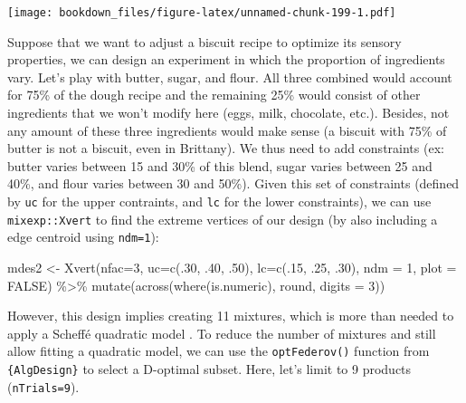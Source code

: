 \documentclass[
]{krantz}
\makeatletter
\newenvironment{Shaded}{\begin{snugshade}}{\end{snugshade}}
\newcommand{\AttributeTok}[1]{\textcolor[rgb]{0.61,0.61,0.61}{#1}}
\newcommand{\ConstantTok}[1]{\textcolor[rgb]{0,0,0}{#1}}
\newcommand{\DecValTok}[1]{\textcolor[rgb]{0.06,0.06,0.06}{#1}}
\newcommand{\FunctionTok}[1]{\textcolor[rgb]{0,0,0}{#1}}
\newcommand{\NormalTok}[1]{#1}
\newcommand{\OtherTok}[1]{\textcolor[rgb]{0.37,0.37,0.37}{#1}}
\newcommand{\SpecialCharTok}[1]{\textcolor[rgb]{0,0,0}{#1}}
\newenvironment{kframe}{%
\medskip{}
\setlength{\fboxsep}{.8em}
 \def\at@end@of@kframe{}%
 \ifinner\ifhmode%
  \def\at@end@of@kframe{\end{minipage}}%
  \begin{minipage}{\columnwidth}%
 \fi\fi%
 \def\FrameCommand##1{\hskip\@totalleftmargin \hskip-\fboxsep
 \colorbox{shadecolor}{##1}\hskip-\fboxsep
     \hskip-\linewidth \hskip-\@totalleftmargin \hskip\columnwidth}%
 \MakeFramed {\advance\hsize-\width
   \@totalleftmargin\z@ \linewidth\hsize
   \@setminipage}}%
 {\par\unskip\endMakeFramed%
 \at@end@of@kframe}
\renewenvironment{Shaded}{\begin{kframe}}{\end{kframe}}
\makeatother
\begin{document}
\texttt{[image: bookdown\_files/figure-latex/unnamed-chunk-199-1.pdf]}

Suppose that we want to adjust a biscuit recipe to optimize its sensory properties, we can design an experiment in which the proportion of ingredients vary. Let's play with butter, sugar, and flour. All three combined would account for 75\% of the dough recipe and the remaining 25\% would consist of other ingredients that we won't modify here (eggs, milk, chocolate, etc.). Besides, not any amount of these three ingredients would make sense (a biscuit with 75\% of butter is not a biscuit, even in Brittany). We thus need to add constraints (ex: butter varies between 15 and 30\% of this blend, sugar varies between 25 and 40\%, and flour varies between 30 and 50\%). Given this set of constraints (defined by \texttt{uc} for the upper contraints, and \texttt{lc} for the lower constraints), we can use \texttt{mixexp::Xvert} to find the extreme vertices of our design (by also including a edge centroid using \texttt{ndm=1}):

\begin{Shaded}
\begin{Highlighting}[]
\NormalTok{mdes2 }\OtherTok{\textless{}{-}} \FunctionTok{Xvert}\NormalTok{(}\AttributeTok{nfac=}\DecValTok{3}\NormalTok{, }\AttributeTok{uc=}\FunctionTok{c}\NormalTok{(.}\DecValTok{30}\NormalTok{, .}\DecValTok{40}\NormalTok{, .}\DecValTok{50}\NormalTok{), }\AttributeTok{lc=}\FunctionTok{c}\NormalTok{(.}\DecValTok{15}\NormalTok{, .}\DecValTok{25}\NormalTok{, .}\DecValTok{30}\NormalTok{), }
               \AttributeTok{ndm =} \DecValTok{1}\NormalTok{, }\AttributeTok{plot =} \ConstantTok{FALSE}\NormalTok{) }\SpecialCharTok{\%\textgreater{}\%} 
      \FunctionTok{mutate}\NormalTok{(}\FunctionTok{across}\NormalTok{(}\FunctionTok{where}\NormalTok{(is.numeric), round, }\AttributeTok{digits =} \DecValTok{3}\NormalTok{))}
\end{Highlighting}
\end{Shaded}

However, this design implies creating 11 mixtures, which is more than needed to apply a Scheffé quadratic model \citep{Lawson2016}. To reduce the number of mixtures and still allow fitting a quadratic model, we can use the \texttt{optFederov()} function from \texttt{\{AlgDesign\}} to select a D-optimal subset. Here, let's limit to 9 products (\texttt{nTrials=9}).
\end{document}
